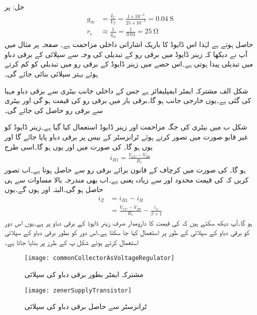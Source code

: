 حل: پر 
\begin{align*}
g_m &=\frac{I_C}{V_T}=\frac{1 \times 10^{-3}}{25 \times 10^{-3}}=\SI{0.04}{\siemens}\\
r_e& \approx \frac{1}{g_m}=\frac{1}{0.04}=\SI{25}{\ohm}
\end{align*}
حاصل ہوتے ہے لہٰذا اس ڈایوڈ کا باریک اشاراتی داخلی مزاحمت  ہے۔
صفحہ  پر مثال  میں آپ نے دیکھا کہ زینر ڈایوڈ میں برقی رو کے تبدیلی کی وجہ سے سپلائی کے برقی دباو میں تبدیلی پیدا ہوتی ہے۔اس حصے میں زینر ڈایوڈ کے برقی رو میں تبدیلی کو کم کرتے ہوئے بہتر سپلائی بنائی جائے گی۔

شکل  الف مشترکہ ایمٹر ایمپلیفائر ہے جس کے داخلی جانب بیٹری سے  برقی دباو مہیا کی گئی ہے۔یوں  خارجی جانب  ہو گا۔برقی بار  میں برقی رو  کی قیمت  ہو گی اور بیٹری سے  برقی رو حاصل کی جائے گی۔

شکل  ب میں بیٹری کی جگہ مزاحمت  اور زینر ڈایوڈ استعمال کیا گیا ہے۔زینر ڈایوڈ کو غیر قابو صورت میں تصور کرتے ہوئے ٹرانزسٹر کے بیس پر  برقی دباو پایا جائے گا اور یوں  ہو گا۔ کی صورت میں  اور یوں  ہو گا۔اسی طرح
\begin{align}
i_{R1}=\frac{V_{CC}-V_{Z0}}{R_1}
\end{align}
ہو گا۔ کی صورت میں کرچاف کے قانون برائے برقی رو  سے   حاصل ہوتا ہے۔اب تصور کریں کہ  کی قیمت محدود اور  سے زیادہ یعنی  ہے۔اب بھی  مندرجہ بالا مساوات سے ہی حاصل ہو گی۔البتہ  اور  ہوں گے۔یوں 
\begin{align*}
i_Z&=i_{R1}-i_B\\
&=\frac{V_{CC}-V_{Z0}}{R_1}-\frac{i_L}{\beta+1}
\end{align*}
ہو گا۔آپ دیکھ سکتے ہیں کہ  کی قیمت کا دارومدار صرف زینر ڈایوڈ کے برقی دباو پر ہے۔یوں اس دور کو برقی دباو کے سپلائی کے طور پر استعمال کیا جا سکتا ہے۔اس دور کو بطور برقی دباو کے سپلائی استعمال کرتے ہوئے شکل  پ کے طرز پر بنایا جاتا ہے۔
%
\begin{figure}
\centering
\texttt{[image: commonCollectorAsVoltageRegulator]}
\caption{مشترکہ ایمٹر بطور برقی دباو کی سپلائی}
\label{شکل_ٹرانزسٹر_مشترکہ_مخارج_بطور_سپلائی}
\end{figure}
%
\begin{figure}
\centering
\texttt{[image: zenerSupplyTransistor]}
\caption{ٹرانزسٹر سے حاصل برقی دباو کی سپلائی}
\label{شکل_دو_جوڑ_ٹرانزسٹر_سپلائی_الف}
\end{figure}

